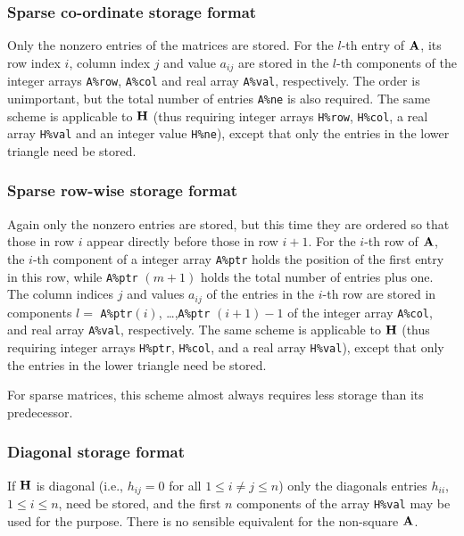 \documentclass{galahad}
\begin{document}
\subsubsection{Sparse co-ordinate storage format}\label{coordinate}
Only the nonzero entries of the matrices are stored. For the 
$l$-th entry of ${\mathbf{A}}$, its row index $i$, column index $j$ 
and value $a_{ij}$
are stored in the $l$-th components of the integer arrays {\tt A\%row}, 
{\tt A\%col} and real array {\tt A\%val}, respectively.
The order is unimportant, but the total
number of entries {\tt A\%ne} is also required. 
The same scheme is applicable to
${\mathbf{H}}$ (thus requiring integer arrays {\tt H\%row}, {\tt H\%col}, a real array 
{\tt H\%val} and an integer value {\tt H\%ne}),
except that only the entries in the lower triangle need be stored.

\subsubsection{Sparse row-wise storage format}\label{rowwise}
Again only the nonzero entries are stored, but this time
they are ordered so that those in row $i$ appear directly before those
in row $i+1$. For the $i$-th row of ${\mathbf{A}}$, the $i$-th component of a 
integer array {\tt A\%ptr} holds the position of the first entry in this row,
while {\tt A\%ptr} $(m+1)$ holds the total number of entries plus one.
The column indices $j$ and values $a_{ij}$ of the entries in the $i$-th row 
are stored in components 
$l =$ {\tt A\%ptr}$(i)$, \ldots ,{\tt A\%ptr} $(i+1)-1$ of the 
integer array {\tt A\%col}, and real array {\tt A\%val}, respectively. 
The same scheme is applicable to
${\mathbf{H}}$ (thus requiring integer arrays {\tt H\%ptr}, {\tt H\%col}, and 
a real array {\tt H\%val}),
except that only the entries in the lower triangle need be stored.

For sparse matrices, this scheme almost always requires less storage than 
its predecessor.

\subsubsection{Diagonal storage format}\label{diagonal}
If ${\mathbf{H}}$ is diagonal (i.e., $h_{ij} = 0$ for all $1 \leq i \neq j \leq n$)
only the diagonals entries $h_{ii}$, $1 \leq i \leq n$,  need be stored,
and the first $n$ components of the array {\tt H\%val} may be used for 
the purpose. There is no sensible equivalent for the non-square ${\mathbf{A}}$.

\end{document}
